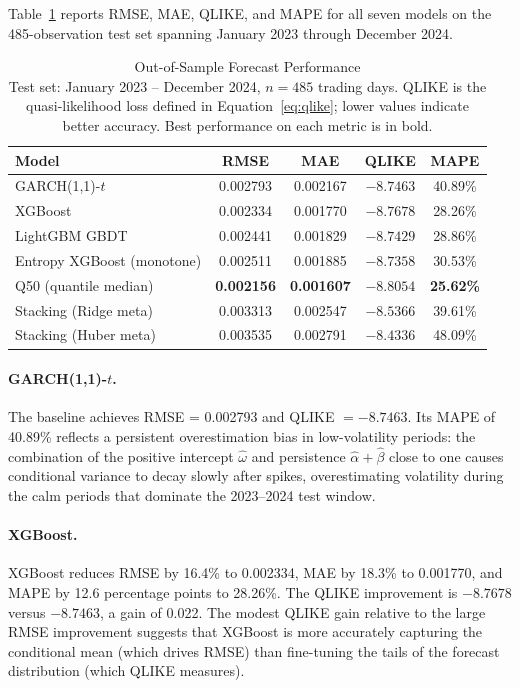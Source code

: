 \documentclass[12pt]{article}
\begin{document}
Table~\ref{tab:results} reports RMSE, MAE, QLIKE, and MAPE for all seven
models on the 485-observation test set spanning January 2023 through December
2024.

\begin{table}[htbp]
\centering
\caption{Out-of-Sample Forecast Performance\\
  {\small Test set: January 2023 -- December 2024, $n = 485$ trading days.
   QLIKE is the \citet{Patton2011} quasi-likelihood loss defined in
   Equation~\eqref{eq:qlike}; lower values indicate better accuracy.
   Best performance on each metric is in bold.}}
\label{tab:results}
\begin{tabular}{lcccc}
\toprule
Model & RMSE & MAE & QLIKE & MAPE \\
\midrule
GARCH(1,1)-$t$ & 0.002793 & 0.002167 & $-8.7463$ & 40.89\% \\
XGBoost        & 0.002334 & 0.001770 & $-8.7678$ & 28.26\% \\
LightGBM GBDT  & 0.002441 & 0.001829 & $-8.7429$ & 28.86\% \\
Entropy XGBoost (monotone) & 0.002511 & 0.001885 & $-8.7358$ & 30.53\% \\
Q50 (quantile median) & \textbf{0.002156} & \textbf{0.001607}
                      & $\mathbf{-8.8054}$ & \textbf{25.62\%} \\
Stacking (Ridge meta) & 0.003313 & 0.002547 & $-8.5366$ & 39.61\% \\
Stacking (Huber meta) & 0.003535 & 0.002791 & $-8.4336$ & 48.09\% \\
\bottomrule
\end{tabular}
\end{table}

\paragraph{GARCH(1,1)-$t$.}
The baseline achieves RMSE = 0.002793 and QLIKE $= -8.7463$.  Its MAPE of
40.89\% reflects a persistent overestimation bias in low-volatility periods:
the combination of the positive intercept $\hat{\omega}$ and persistence
$\hat{\alpha} + \hat{\beta}$ close to one causes conditional variance to
decay slowly after spikes, overestimating volatility during the calm periods
that dominate the 2023--2024 test window.

\paragraph{XGBoost.}
XGBoost reduces RMSE by 16.4\% to 0.002334, MAE by 18.3\% to 0.001770, and
MAPE by 12.6 percentage points to 28.26\%.  The QLIKE improvement is
$-8.7678$ versus $-8.7463$, a gain of 0.022.  The modest QLIKE gain relative
to the large RMSE improvement suggests that XGBoost is more accurately
capturing the conditional mean (which drives RMSE) than fine-tuning the tails
of the forecast distribution (which QLIKE measures).
\end{document}
